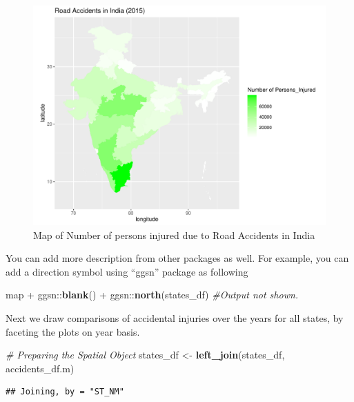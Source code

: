 \documentclass[]{article}
\newenvironment{Shaded}{}{}
\newcommand{\CommentTok}[1]{\textcolor[rgb]{0.38,0.63,0.69}{\textit{#1}}}
\newcommand{\KeywordTok}[1]{\textcolor[rgb]{0.00,0.44,0.13}{\textbf{#1}}}
\newcommand{\NormalTok}[1]{#1}
\newcommand{\OperatorTok}[1]{\textcolor[rgb]{0.40,0.40,0.40}{#1}}
\newcommand{\StringTok}[1]{\textcolor[rgb]{0.25,0.44,0.63}{#1}}
\begin{document}
\begin{figure}
\centering
\includegraphics{TutorialNotebook_files/figure-latex/unnamed-chunk-22-1.pdf}
\caption{Map of Number of persons injured due to Road Accidents in
India}
\end{figure}

You can add more description from other packages as well. For example,
you can add a direction symbol using ``ggsn'' package as following

\begin{Shaded}
\begin{Highlighting}[]
\NormalTok{map }\OperatorTok{+}\StringTok{ }\NormalTok{ggsn}\OperatorTok{::}\KeywordTok{blank}\NormalTok{() }\OperatorTok{+}\StringTok{ }\NormalTok{ggsn}\OperatorTok{::}\KeywordTok{north}\NormalTok{(states_df) }\CommentTok{#Output not shown.}
\end{Highlighting}
\end{Shaded}

Next we draw comparisons of accidental injuries over the years for all
states, by faceting the plots on year basis.

\begin{Shaded}
\begin{Highlighting}[]
\CommentTok{# Preparing the Spatial Object}
\NormalTok{states_df <-}\StringTok{ }\KeywordTok{left_join}\NormalTok{(states_df, accidents_df.m)}
\end{Highlighting}
\end{Shaded}

\begin{verbatim}
## Joining, by = "ST_NM"
\end{verbatim}
\end{document}
